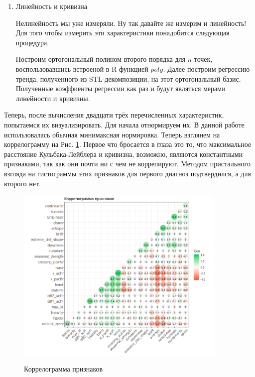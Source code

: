 \documentclass[a4paper,12pt]{article}
\begin{document}
\begin{enumerate}
	\item Линейность и кривизна
	
	Нелинейность мы уже измеряли. Ну так давайте же измерим и линейность! Для того чтобы измерить эти характеристики понадобится следующая процедура.
	
	Построим ортогональный полином второго порядка для $ n $ точек, воспользовавшись встроеной в R функцией $ poly $. Далее построим регрессию тренда, полученного из STL-декомпозиции, на этот ортогональный базис. Полученные коэффиенты регрессии как раз и будут являться мерами линейности и кривизны.
	
		
	

\end{enumerate}
	


	Теперь, после вычисления двадцати трёх перечисленных характеристик, попытаемся их визуализировать. Для начала отнормируем их. В данной работе использовалась обычная минимаксная нормировка. Теперь взглянем на коррелограмму на Рис. \ref{corr}.
Первое что бросается в глаза это то, что  максимальное расстояние Кульбака-Лейблера и кривизна, возможно, являются константными признаками, так как они почти ни с чем не коррелируют. Методом пристального взгляда на гистограммы этих признаков для первого диагноз подтвердился, а для второго нет. 

\begin{figure}[h!]
		\begin{center}
	\includegraphics[width=0.9\textwidth]{corr}%
	
	\label{corr}
	\caption{Коррелограмма признаков}
	
\end{center}
\end{figure} 
\end{document}
